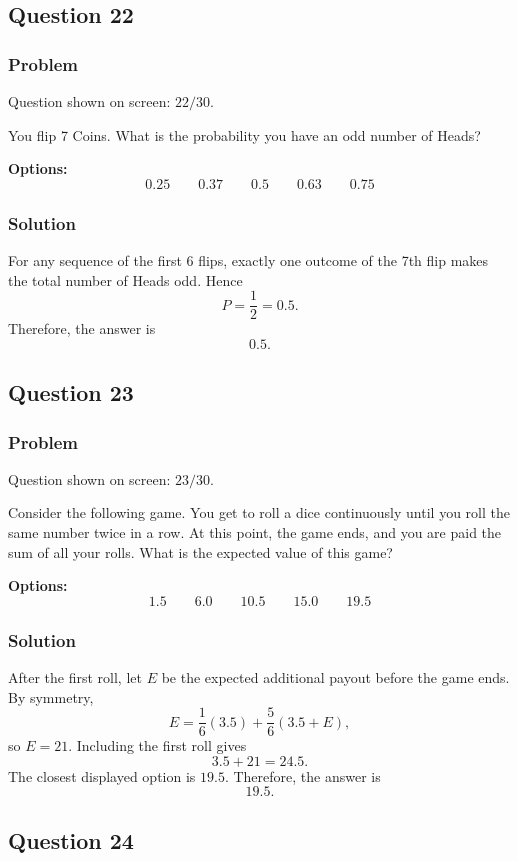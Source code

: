 \documentclass[12pt]{article}
\begin{document}
\subsection{Question 22}
\subsubsection{Problem}
Question shown on screen: \(22/30\).

You flip 7 Coins. What is the probability you have an odd number of Heads?

\noindent\textbf{Options:}
\[
\boxed{0.25}
\qquad
\boxed{0.37}
\qquad
\boxed{0.5}
\qquad
\boxed{0.63}
\qquad
\boxed{0.75}
\]

\subsubsection{Solution}
For any sequence of the first 6 flips, exactly one outcome of the 7th flip makes the total number of Heads odd. Hence
\[
P=\frac{1}{2}=0.5.
\]
Therefore, the answer is
\[
\boxed{0.5}.
\]

\subsection{Question 23}
\subsubsection{Problem}
Question shown on screen: \(23/30\).

Consider the following game. You get to roll a dice continuously until you roll the same number twice in a row. At this point, the game ends, and you are paid the sum of all your rolls. What is the expected value of this game?

\noindent\textbf{Options:}
\[
\boxed{1.5}
\qquad
\boxed{6.0}
\qquad
\boxed{10.5}
\qquad
\boxed{15.0}
\qquad
\boxed{19.5}
\]

\subsubsection{Solution}
After the first roll, let \(E\) be the expected additional payout before the game ends. By symmetry,
\[
E=\frac{1}{6}(3.5)+\frac{5}{6}(3.5+E),
\]
so \(E=21\). Including the first roll gives
\[
3.5+21=24.5.
\]
The closest displayed option is \(19.5\). Therefore, the answer is
\[
\boxed{19.5}.
\]

\subsection{Question 24}
\end{document}
